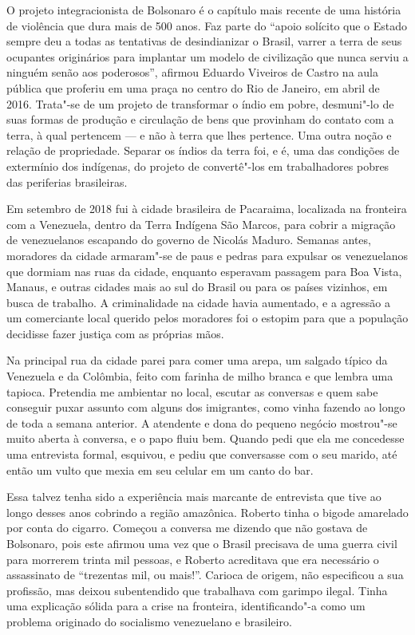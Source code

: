 O projeto integracionista de Bolsonaro é o capítulo mais recente de uma
história de violência que dura mais de 500 anos. Faz parte do ``apoio
solícito que o Estado sempre deu a todas as tentativas de desindianizar
o Brasil, varrer a terra de seus ocupantes originários para implantar um
modelo de civilização que nunca serviu a ninguém senão aos poderosos'',
afirmou Eduardo Viveiros de Castro na aula pública que proferiu em uma
praça no centro do Rio de Janeiro, em abril de 2016. Trata"-se de um
projeto de transformar o índio em pobre, desmuni"-lo de suas formas de
produção e circulação de bens que provinham do contato com a terra, à
qual pertencem --- e não à terra que lhes pertence. Uma outra noção e
relação de propriedade. Separar os índios da terra foi, e é, uma das
condições de extermínio dos indígenas, do projeto de convertê"-los em
trabalhadores pobres das periferias brasileiras.

\asterisc

Em setembro de 2018 fui à cidade brasileira de Pacaraima, localizada na
fronteira com a Venezuela, dentro da Terra Indígena São Marcos, para
cobrir a migração de venezuelanos escapando do governo de
Nicolás Maduro. Semanas antes, moradores da cidade armaram"-se de paus e
pedras para expulsar os venezuelanos que dormiam nas ruas da cidade,
enquanto esperavam passagem para Boa Vista, Manaus, e outras cidades
mais ao sul do Brasil ou para os países vizinhos, em busca de trabalho.
A criminalidade na cidade havia aumentado, e a agressão a um comerciante
local querido pelos moradores foi o estopim para que a população
decidisse fazer justiça com as próprias mãos.

Na principal rua da cidade parei para comer uma arepa, um salgado típico
da Venezuela e da Colômbia, feito com farinha de milho branca e que
lembra uma tapioca. Pretendia me ambientar no local, escutar as
conversas e quem sabe conseguir puxar assunto com alguns dos imigrantes,
como vinha fazendo ao longo de toda a semana anterior. A atendente e
dona do pequeno negócio mostrou"-se muito aberta à conversa, e o papo
fluiu bem. Quando pedi que ela me concedesse uma entrevista formal,
esquivou, e pediu que conversasse com o seu marido, até então um vulto
que mexia em seu celular em um canto do bar.

Essa talvez tenha sido a experiência mais marcante de entrevista que
tive ao longo desses anos cobrindo a região amazônica. Roberto
tinha o bigode amarelado por conta do cigarro. Começou a conversa me
dizendo que não gostava de Bolsonaro, pois este afirmou uma vez que o
Brasil precisava de uma guerra civil para morrerem trinta mil pessoas, e
Roberto acreditava que era necessário o assassinato de ``trezentas mil,
ou mais!''. Carioca de origem, não especificou a sua profissão, mas
deixou subentendido que trabalhava com garimpo ilegal. Tinha uma
explicação sólida para a crise na fronteira, identificando"-a como um
problema originado do socialismo venezuelano e brasileiro.

